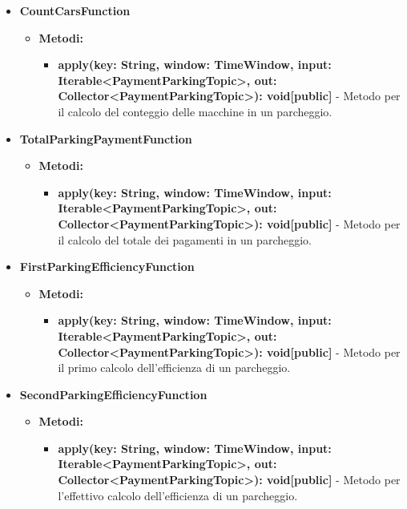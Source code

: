 \documentclass[8pt]{article}
\begin{document}
\begin{itemize}
\begin{itemize}
\begin{itemize}
        \end{itemize}
    \end{itemize}
    \item \textbf{CountCarsFunction}
    \begin{itemize}
        \item \textbf{Metodi:}
        \begin{itemize}
            \item \textbf{apply(key: String, window: TimeWindow, input: Iterable<PaymentParkingTopic>, out: Collector<PaymentParkingTopic>): void[public]} - Metodo per il calcolo del conteggio delle macchine in un parcheggio.
        \end{itemize}
    \end{itemize}
    \item \textbf{TotalParkingPaymentFunction}
    \begin{itemize}
        \item \textbf{Metodi:}
        \begin{itemize}
            \item \textbf{apply(key: String, window: TimeWindow, input: Iterable<PaymentParkingTopic>, out: Collector<PaymentParkingTopic>): void[public]} - Metodo per il calcolo del totale dei pagamenti in un parcheggio.
        \end{itemize}
    \end{itemize}
    \item \textbf{FirstParkingEfficiencyFunction}
    \begin{itemize}
        \item \textbf{Metodi:}
        \begin{itemize}
            \item \textbf{apply(key: String, window: TimeWindow, input: Iterable<PaymentParkingTopic>, out: Collector<PaymentParkingTopic>): void[public]} - Metodo per il primo calcolo dell'efficienza di un parcheggio.
        \end{itemize}
    \end{itemize}
    \item \textbf{SecondParkingEfficiencyFunction}
    \begin{itemize}
        \item \textbf{Metodi:}
        \begin{itemize}
            \item \textbf{apply(key: String, window: TimeWindow, input: Iterable<PaymentParkingTopic>, out: Collector<PaymentParkingTopic>): void[public]} - Metodo per l'effettivo calcolo dell'efficienza di un parcheggio.

\end{itemize}
\end{itemize}
\end{itemize}
\end{document}
